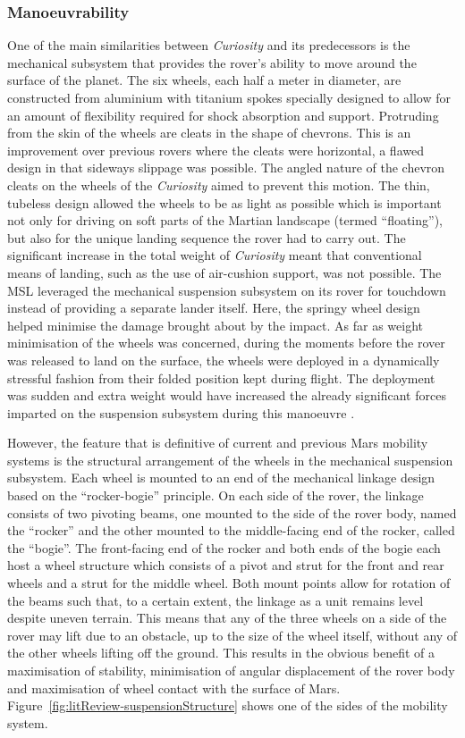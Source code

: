       \subsubsection{Manoeuvrability}
      \label{subsubsec:lit-manoeuvrability}
        One of the main similarities between \textit{Curiosity} and its predecessors is the mechanical subsystem that provides the rover's ability to move around the surface of the planet. The six wheels, each half a meter in diameter, are constructed from aluminium with titanium spokes specially designed to allow for an amount of flexibility required for shock absorption and support. Protruding from the skin of the wheels are cleats in the shape of chevrons. This is an improvement over previous rovers where the cleats were horizontal, a flawed design in that sideways slippage was possible. The angled nature of the chevron cleats on the wheels of the \textit{Curiosity} aimed to prevent this motion. The thin, tubeless design allowed the wheels to be as light as possible which is important not only for driving on soft parts of the Martian landscape (termed ``floating''), but also for the unique landing sequence the rover had to carry out. The significant increase in the total weight of \textit{Curiosity} meant that conventional means of landing, such as the use of air-cushion support, was not possible. The MSL leveraged the mechanical suspension subsystem on its rover for touchdown instead of providing a separate lander itself. Here, the springy wheel design helped minimise the damage brought about by the impact. As far as weight minimisation of the wheels was concerned, during the moments before the rover was released to land on the surface, the wheels were deployed in a dynamically stressful fashion from their folded position kept during flight. The deployment was sudden and extra weight would have increased the already significant forces imparted on the suspension subsystem during this manoeuvre \cite{planetary2014}.
        
        However, the feature that is definitive of current and previous Mars mobility systems is the structural arrangement of the wheels in the mechanical suspension subsystem. Each wheel is mounted to an end of the mechanical linkage design based on the ``rocker-bogie'' principle. On each side of the rover, the linkage consists of two pivoting beams, one mounted to the side of the rover body, named the ``rocker'' and the other mounted to the middle-facing end of the rocker, called the ``bogie''. The front-facing end of the rocker and both ends of the bogie each host a wheel structure which consists of a pivot and strut for the front and rear wheels and a strut for the middle wheel. Both mount points allow for rotation of the beams such that, to a certain extent, the linkage as a unit remains level despite uneven terrain. This means that any of the three wheels on a side of the rover may lift due to an obstacle, up to the size of the wheel itself, without any of the other wheels lifting off the ground. This results in the obvious benefit of a maximisation of stability, minimisation of angular displacement of the rover body and maximisation of wheel contact with the surface of Mars. Figure~\ref{fig:litReview-suspensionStructure} shows one of the sides of the mobility system.
        

